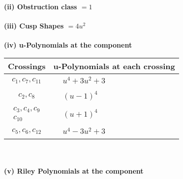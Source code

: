\documentclass[1p]{elsarticle_modified}
\theoremstyle{definition}
\begin{document}
\flushleft \textbf{(ii) Obstruction class $= 1$}\\~\\
\flushleft \textbf{(iii) Cusp Shapes $= 4 u^2$}\\~\\
\newpage\renewcommand{\arraystretch}{1}
\flushleft \textbf{(iv) u-Polynomials at the component}\newline \\
\begin{tabular}{m{50pt}|m{274pt}}
Crossings & \hspace{64pt}u-Polynomials at each crossing \\
\hline $$\begin{aligned}c_{1},c_{7},c_{11}\end{aligned}$$&$\begin{aligned}
&u^4+3 u^2+3
\end{aligned}$\\
\hline $$\begin{aligned}c_{2},c_{8}\end{aligned}$$&$\begin{aligned}
&(u-1)^4
\end{aligned}$\\
\hline $$\begin{aligned}c_{3},c_{4},c_{9}\\c_{10}\end{aligned}$$&$\begin{aligned}
&(u+1)^4
\end{aligned}$\\
\hline $$\begin{aligned}c_{5},c_{6},c_{12}\end{aligned}$$&$\begin{aligned}
&u^4-3 u^2+3
\end{aligned}$\\
\hline
\end{tabular}\\~\\
\newpage\renewcommand{\arraystretch}{1}
\flushleft \textbf{(v) Riley Polynomials at the component}\newline \\
\end{document}

